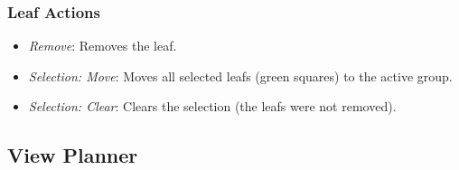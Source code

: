 \subsubsection{Leaf Actions}
\label{sec:leafActions}

\begin{itemize}
	\item \textit{Remove}: Removes the leaf.
	\item \textit{Selection: Move}: Moves all selected leafs (green squares) to the active group.
	\item \textit{Selection: Clear}: Clears the selection (the leafs were not removed).
\end{itemize}

\newpage
\subsection{View Planner}
\label{sec:viewplanner}

